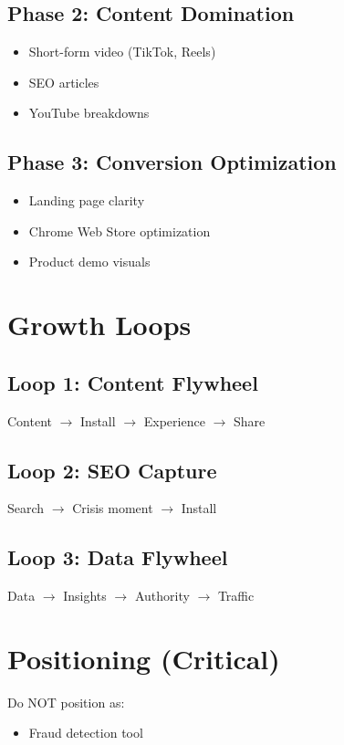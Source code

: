 \documentclass[11pt]{article}
\begin{document}
\subsection{Phase 2: Content Domination}
\begin{itemize}
    \item Short-form video (TikTok, Reels)
    \item SEO articles
    \item YouTube breakdowns
\end{itemize}

\subsection{Phase 3: Conversion Optimization}
\begin{itemize}
    \item Landing page clarity
    \item Chrome Web Store optimization
    \item Product demo visuals
\end{itemize}

\section{Growth Loops}

\subsection{Loop 1: Content Flywheel}
Content $\rightarrow$ Install $\rightarrow$ Experience $\rightarrow$ Share

\subsection{Loop 2: SEO Capture}
Search $\rightarrow$ Crisis moment $\rightarrow$ Install

\subsection{Loop 3: Data Flywheel}
Data $\rightarrow$ Insights $\rightarrow$ Authority $\rightarrow$ Traffic

\section{Positioning (Critical)}

Do NOT position as:
\begin{itemize}
    \item Fraud detection tool
\end{itemize}
\end{document}

